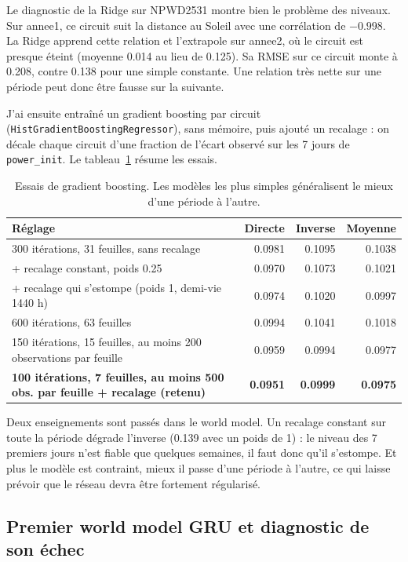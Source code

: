 \documentclass[11pt,a4paper]{article}
\newcommand{\code}[1]{\texttt{#1}}
\begin{document}
Le diagnostic de la Ridge sur NPWD2531 montre bien le problème des niveaux. Sur annee1, ce circuit suit la distance au Soleil avec une corrélation de $-0.998$. La Ridge apprend cette relation et l'extrapole sur annee2, où le circuit est presque éteint (moyenne 0.014 au lieu de 0.125). Sa RMSE sur ce circuit monte à 0.208, contre 0.138 pour une simple constante. Une relation très nette sur une période peut donc être fausse sur la suivante.

J'ai ensuite entraîné un gradient boosting par circuit (\code{HistGradientBoostingRegressor}), sans mémoire, puis ajouté un recalage : on décale chaque circuit d'une fraction de l'écart observé sur les 7 jours de \code{power\_init}. Le tableau~\ref{tab:boosting} résume les essais.

\begin{table}[!htb]
\centering\small
\caption{Essais de gradient boosting. Les modèles les plus simples généralisent le mieux d'une période à l'autre.}
\label{tab:boosting}
\begin{tabularx}{\linewidth}{X r r r}
\toprule
Réglage & Directe & Inverse & Moyenne \\
\midrule
300 itérations, 31 feuilles, sans recalage & 0.0981 & 0.1095 & 0.1038 \\
+ recalage constant, poids 0.25 & 0.0970 & 0.1073 & 0.1021 \\
+ recalage qui s'estompe (poids 1, demi-vie 1440 h) & 0.0974 & 0.1020 & 0.0997 \\
600 itérations, 63 feuilles & 0.0994 & 0.1041 & 0.1018 \\
150 itérations, 15 feuilles, au moins 200 observations par feuille & 0.0959 & 0.0994 & 0.0977 \\
\rowcolor{fond} \textbf{100 itérations, 7 feuilles, au moins 500 obs. par feuille + recalage (retenu)} & \textbf{0.0951} & \textbf{0.0999} & \textbf{0.0975} \\
\bottomrule
\end{tabularx}
\end{table}

Deux enseignements sont passés dans le world model. Un recalage constant sur toute la période dégrade l'inverse (0.139 avec un poids de 1) : le niveau des 7 premiers jours n'est fiable que quelques semaines, il faut donc qu'il s'estompe. Et plus le modèle est contraint, mieux il passe d'une période à l'autre, ce qui laisse prévoir que le réseau devra être fortement régularisé.

\subsection{Premier world model GRU et diagnostic de son échec}
\end{document}
